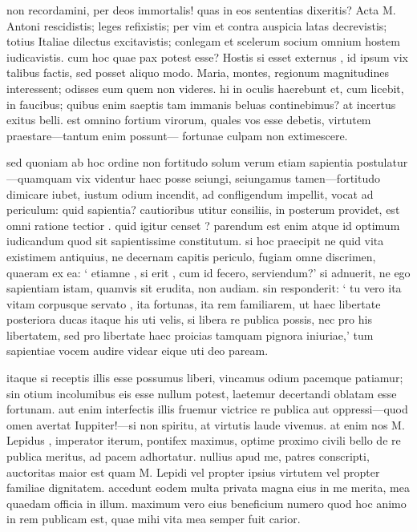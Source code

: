  non recordamini, per deos immortalis! quas in eos sententias dixeritis? Acta M. Antoni rescidistis; leges refixistis; per vim et contra auspicia latas decrevistis; totius Italiae dilectus excitavistis; conlegam et scelerum socium omnium hostem iudicavistis. cum hoc quae pax potest esse? Hostis si esset externus , id ipsum vix talibus factis, sed posset aliquo modo. Maria, montes, regionum magnitudines interessent; odisses eum quem non videres. hi in oculis haerebunt et, cum licebit, in faucibus; quibus enim saeptis tam immanis beluas continebimus? at incertus exitus belli. est omnino fortium virorum, quales vos esse debetis, virtutem praestare—tantum enim possunt— fortunae culpam non extimescere.

 sed quoniam ab hoc ordine non fortitudo solum verum etiam sapientia postulatur—quamquam vix videntur haec posse seiungi, seiungamus tamen—fortitudo dimicare iubet, iustum odium incendit, ad confligendum impellit, vocat ad periculum: quid sapientia? cautioribus utitur consiliis, in posterum providet, est omni ratione tectior . quid igitur censet ? parendum est enim atque id optimum iudicandum quod sit sapientissime constitutum. si hoc praecipit ne quid vita existimem antiquius, ne decernam capitis periculo, fugiam omne discrimen, quaeram ex ea: ` etiamne , si erit , cum id fecero, serviendum?' si adnuerit, ne ego sapientiam istam, quamvis sit erudita, non audiam. sin responderit: ` tu vero ita vitam corpusque servato , ita fortunas, ita rem familiarem, ut haec libertate posteriora ducas itaque his uti velis, si libera re publica possis, nec pro his libertatem, sed pro libertate haec proicias tamquam pignora iniuriae,' tum sapientiae vocem audire videar eique uti deo paream.

 itaque si receptis illis esse possumus liberi, vincamus odium pacemque patiamur; sin otium incolumibus eis esse nullum potest, laetemur decertandi oblatam esse fortunam. aut enim interfectis illis fruemur victrice re publica aut oppressi—quod omen avertat Iuppiter!—si non spiritu, at virtutis laude vivemus. at enim nos M. Lepidus , imperator iterum, pontifex maximus, optime proximo civili bello de re publica meritus, ad pacem adhortatur. nullius apud me, patres conscripti, auctoritas maior est quam M. Lepidi vel propter ipsius virtutem vel propter familiae dignitatem. accedunt eodem multa privata magna eius in me merita, mea quaedam officia in illum. maximum vero eius beneficium numero quod hoc animo in rem publicam est, quae mihi vita mea semper fuit carior.


